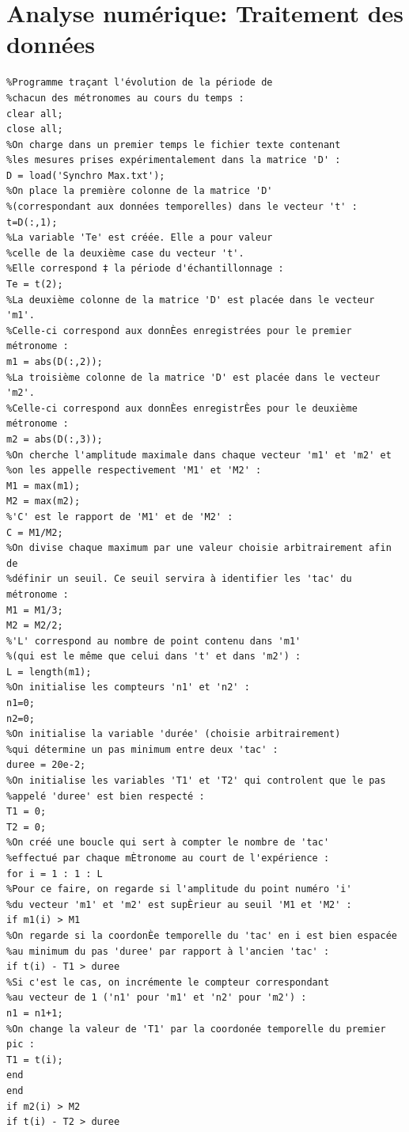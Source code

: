 \documentclass[a4paper,11pt]{report}
\begin{document}
\chapter{Analyse numérique: Traitement des données}
\label{Traitement}
\begin{verbatim}
%Programme traçant l'évolution de la période de
%chacun des métronomes au cours du temps :
clear all;
close all;
%On charge dans un premier temps le fichier texte contenant
%les mesures prises expérimentalement dans la matrice 'D' :
D = load('Synchro Max.txt');
%On place la première colonne de la matrice 'D'
%(correspondant aux données temporelles) dans le vecteur 't' :
t=D(:,1);
%La variable 'Te' est créée. Elle a pour valeur
%celle de la deuxième case du vecteur 't'.
%Elle correspond ‡ la période d'échantillonnage :
Te = t(2);
%La deuxième colonne de la matrice 'D' est placée dans le vecteur 'm1'.
%Celle-ci correspond aux donnÈes enregistrées pour le premier métronome :
m1 = abs(D(:,2));
%La troisième colonne de la matrice 'D' est placée dans le vecteur 'm2'.
%Celle-ci correspond aux donnÈes enregistrÈes pour le deuxième métronome :
m2 = abs(D(:,3));
%On cherche l'amplitude maximale dans chaque vecteur 'm1' et 'm2' et
%on les appelle respectivement 'M1' et 'M2' :
M1 = max(m1);
M2 = max(m2);
%'C' est le rapport de 'M1' et de 'M2' :
C = M1/M2;
%On divise chaque maximum par une valeur choisie arbitrairement afin de
%définir un seuil. Ce seuil servira à identifier les 'tac' du métronome :
M1 = M1/3;
M2 = M2/2;
%'L' correspond au nombre de point contenu dans 'm1'
%(qui est le même que celui dans 't' et dans 'm2') :
L = length(m1);
%On initialise les compteurs 'n1' et 'n2' :
n1=0;
n2=0;
%On initialise la variable 'durée' (choisie arbitrairement)
%qui détermine un pas minimum entre deux 'tac' :
duree = 20e-2;
%On initialise les variables 'T1' et 'T2' qui controlent que le pas
%appelé 'duree' est bien respecté :
T1 = 0;
T2 = 0;
%On créé une boucle qui sert à compter le nombre de 'tac'
%effectué par chaque mÈtronome au court de l'expérience :
for i = 1 : 1 : L
%Pour ce faire, on regarde si l'amplitude du point numéro 'i'
%du vecteur 'm1' et 'm2' est supÈrieur au seuil 'M1 et 'M2' :
if m1(i) > M1
%On regarde si la coordonÈe temporelle du 'tac' en i est bien espacée
%au minimum du pas 'duree' par rapport à l'ancien 'tac' :
if t(i) - T1 > duree
%Si c'est le cas, on incrémente le compteur correspondant
%au vecteur de 1 ('n1' pour 'm1' et 'n2' pour 'm2') :
n1 = n1+1;
%On change la valeur de 'T1' par la coordonée temporelle du premier pic :
T1 = t(i);
end
end
if m2(i) > M2
if t(i) - T2 > duree

\end{verbatim}
\end{document}

